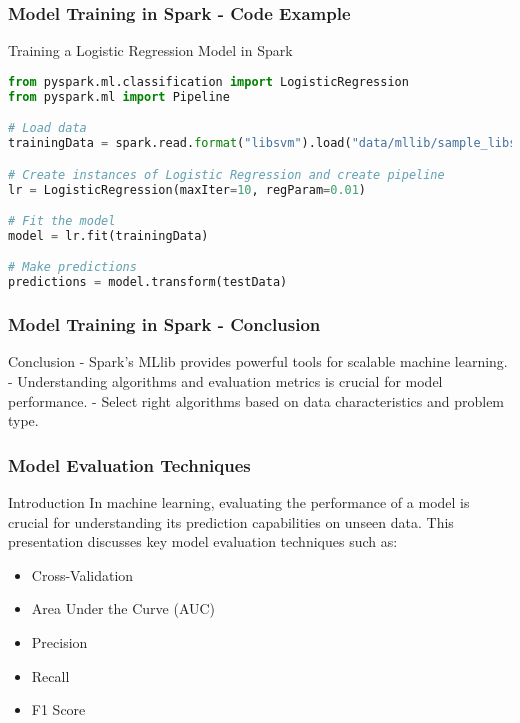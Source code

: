 \documentclass[aspectratio=169]{beamer}
\begin{document}
\begin{frame}[fragile]
    \frametitle{Model Training in Spark - Code Example}
    \begin{block}{Training a Logistic Regression Model in Spark}
        \begin{lstlisting}[language=Python]
from pyspark.ml.classification import LogisticRegression
from pyspark.ml import Pipeline

# Load data
trainingData = spark.read.format("libsvm").load("data/mllib/sample_libsvm_data.txt")

# Create instances of Logistic Regression and create pipeline
lr = LogisticRegression(maxIter=10, regParam=0.01)

# Fit the model
model = lr.fit(trainingData)

# Make predictions
predictions = model.transform(testData)
        \end{lstlisting}
    \end{block}
\end{frame}

\begin{frame}[fragile]
    \frametitle{Model Training in Spark - Conclusion}
    \begin{block}{Conclusion}
        - Spark's MLlib provides powerful tools for scalable machine learning.
        - Understanding algorithms and evaluation metrics is crucial for model performance.
        - Select right algorithms based on data characteristics and problem type.
    \end{block}
\end{frame}

\begin{frame}[fragile]
    \frametitle{Model Evaluation Techniques}
    \begin{block}{Introduction}
        In machine learning, evaluating the performance of a model is crucial for understanding its prediction capabilities on unseen data. This presentation discusses key model evaluation techniques such as:
        \begin{itemize}
            \item Cross-Validation
            \item Area Under the Curve (AUC)
            \item Precision
            \item Recall
            \item F1 Score
        \end{itemize}
    \end{block}
\end{frame}
\end{document}
